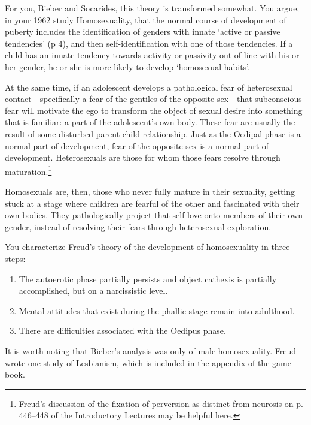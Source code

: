 \begin{refsection}
For you, Bieber and Socarides, this theory is transformed somewhat. You argue, in your 1962 study Homosexuality, that the normal course of development of puberty includes the identification of genders with innate `active or passive tendencies' (p 4), and then self-identification with one of those tendencies. If a child has an innate tendency towards activity or passivity out of line with his or her gender, he or she is more likely to develop `homosexual habits'.

At the same time, if an adolescent develops a pathological fear of heterosexual contact---specifically a fear of the gentiles of the opposite sex---that subconscious fear will motivate the ego to transform the object of sexual desire into something that is familiar: a part of the adolescent's own body. These fear are usually the result of some disturbed parent-child relationship. Just as the Oedipal phase is a normal part of development, fear of the opposite sex is a normal part of development. Heterosexuals are those for whom those fears resolve through maturation.\footnote{Freud's discussion of the fixation of perversion as distinct from neurosis on p. 446--448 of the Introductory Lectures may be helpful here.}

Homosexuals are, then, those who never fully mature in their sexuality, getting stuck at a stage where children are fearful of the other and fascinated with their own bodies. They pathologically project that self-love onto members of their own gender, instead of resolving their fears through heterosexual exploration.

You characterize Freud's theory of the development of homosexuality in three steps:

\begin{enumerate}
\item The autoerotic phase partially persists and object cathexis is partially accomplished, but on a narcissistic level.

\item Mental attitudes that exist during the phallic stage remain into adulthood.

\item There are difficulties associated with the Oedipus phase.

\end{enumerate}

It is worth noting that Bieber's analysis was only of male homosexuality. Freud wrote one study of Lesbianism, which is included in the appendix of the game book.


\end{refsection}
